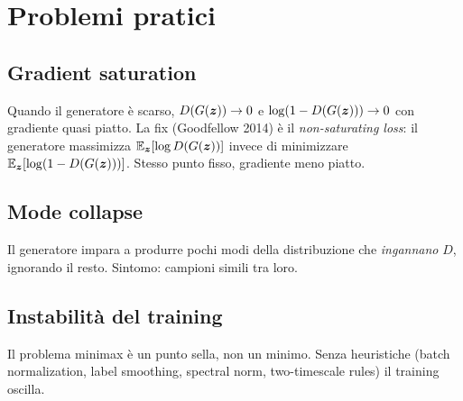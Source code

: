 \section{Problemi pratici}

\subsection{Gradient saturation}
Quando il generatore è scarso, $D(G(\bm{z})) \to 0$ e $\log(1-D(G(\bm{z}))) \to 0$ con gradiente quasi piatto. La fix (Goodfellow 2014) è il \emph{non-saturating loss}: il generatore massimizza $\mathbb{E}_{\bm{z}}[\log D(G(\bm{z}))]$ invece di minimizzare $\mathbb{E}_{\bm{z}}[\log(1 - D(G(\bm{z})))]$. Stesso punto fisso, gradiente meno piatto.

\subsection{Mode collapse}
Il generatore impara a produrre pochi modi della distribuzione che \emph{ingannano} $D$, ignorando il resto. Sintomo: campioni simili tra loro.

\subsection{Instabilità del training}
Il problema minimax è un punto sella, non un minimo. Senza heuristiche (batch normalization, label smoothing, spectral norm, two-timescale rules) il training oscilla.

